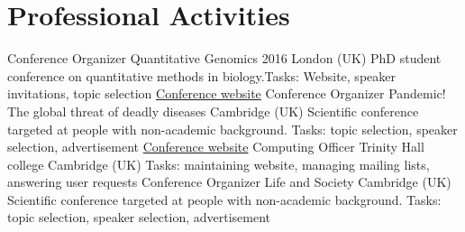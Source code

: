 \documentclass[11pt,a4paper]{moderncv}
\newcommand\chref[3][magenta]{\href{#2}{\small\color{#1}#3}}
\begin{document}
\section{Professional Activities}
         {Conference Organizer}
         {\hfill\break Quantitative Genomics 2016}
         {London (UK)}
         {\hfill\break PhD student conference on quantitative methods in biology.\hfill\break Tasks: Website, speaker invitations, topic selection}
         {\chref{http://quantitative-genomics.com/}{Conference website}}
         {Conference Organizer}
         {Pandemic! The global threat of deadly diseases}
         {Cambridge (UK)}
         {\hfill\break Scientific conference targeted at people with non-academic background.
          \hfill\break Tasks: topic selection, speaker selection, advertisement}
         {\chref{http://www.ebi.ac.uk/about/events/science-and-society-2015}{Conference website}}
         {Computing Officer}
         {\hfill\break Trinity Hall college}
         {Cambridge (UK)}
         {\hfill\break Tasks: maintaining website, managing mailing lists, answering user requests}
         {}
         {Conference Organizer}
         {Life and Society}
         {Cambridge (UK)}
         {\hfill\break Scientific conference targeted at people with non-academic background.
          \hfill\break Tasks: topic selection, speaker selection, advertisement}
         {}
\end{document}
